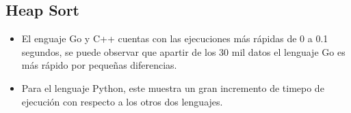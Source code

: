\documentclass{article}
\begin{document}
	\subsection{Heap Sort}
		\begin{itemize}
			\item El enguaje Go y C++ cuentas con las ejecuciones más rápidas de 0 a 0.1 segundos, se puede observar que apartir de los 30 mil datos el lenguaje Go es más rápido por pequeñas diferencias.
			\item Para el lenguaje Python, este muestra un gran incremento de timepo de ejecución con respecto a los otros dos lenguajes.        
		\end{itemize}
		
	
\end{document}
